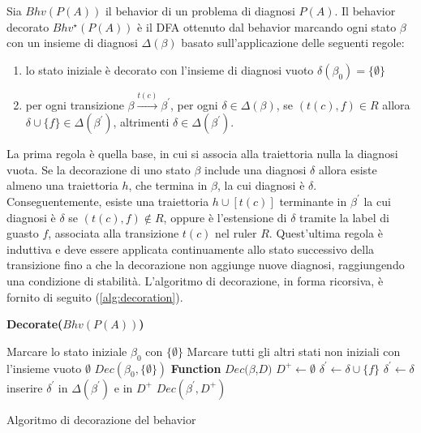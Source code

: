 \begin{defn}
Sia $Bhv(P(A))$ il behavior di un problema di diagnosi $P(A)$. Il behavior decorato $Bhv^\star(P(A))$ è il DFA ottenuto dal behavior marcando ogni stato $\beta$ con un insieme di diagnosi $\Delta(\beta)$ basato sull'applicazione delle seguenti regole:
\begin{enumerate}
\item lo stato iniziale è decorato con l'insieme di diagnosi vuoto $\delta(\beta_0) = \{\emptyset\}$
\item per ogni transizione $\beta \xrightarrow{t(c)} \beta^\prime$, per ogni $\delta \in \Delta(\beta)$, se $(t(c),f) \in R$ allora $\delta \cup \{f\} \in \Delta(\beta^\prime)$, altrimenti $\delta \in \Delta(\beta^\prime)$.
\end{enumerate}
\end{defn}
La prima regola è quella base, in cui si associa alla traiettoria nulla la diagnosi vuota.
Se la decorazione di uno stato $\beta$ include una diagnosi $\delta$ allora esiste almeno una traiettoria $h$, che termina in $\beta$, la cui diagnosi è $\delta$. Conseguentemente, esiste una traiettoria $h \cup [t(c)]$ terminante in $\beta^\prime$ la cui diagnosi è $\delta$ se $(t(c),f) \notin R$, oppure è l'estensione di $\delta$ tramite la label di guasto $f$, associata alla transizione $t(c)$ nel ruler $R$. 
Quest'ultima regola è induttiva e deve essere applicata continuamente allo stato successivo della transizione fino a che la decorazione non aggiunge nuove diagnosi, raggiungendo una condizione di stabilità.
L'algoritmo di decorazione, in forma ricorsiva, è fornito di seguito (\ref{alg:decoration}).

\begin{algorithm}
\textbf{Decorate($Bhv(P(A))$)}
\begin{algorithmic}
\STATE Marcare lo stato iniziale $\beta_0$ con $\{\emptyset\}$ 
\STATE Marcare tutti gli altri stati non iniziali con l'insieme vuoto $\emptyset$
\STATE $Dec(\beta_0,\{\emptyset\})$
\STATE
\STATE \textbf{Function} $Dec(\beta$,$D)$
		\STATE $D^+ \leftarrow \emptyset$
				\STATE $\delta^\prime \leftarrow \delta \cup \{f\}$
			\ELSE
				\STATE $\delta^\prime \leftarrow \delta$
			\ENDIF
			\IF{$\delta^\prime \notin \Delta(\beta^\prime)$}
				\STATE inserire $\delta^\prime$ in $\Delta(\beta^\prime)$ e in $D^+$
			\ENDIF
		\ENDFOR
			\STATE $Dec(\beta^\prime, D^+)$
		\ENDIF
	\ENDFOR
\end{algorithmic}
\caption{Algoritmo di decorazione del behavior}
\label{alg:decoration}
\end{algorithm}

